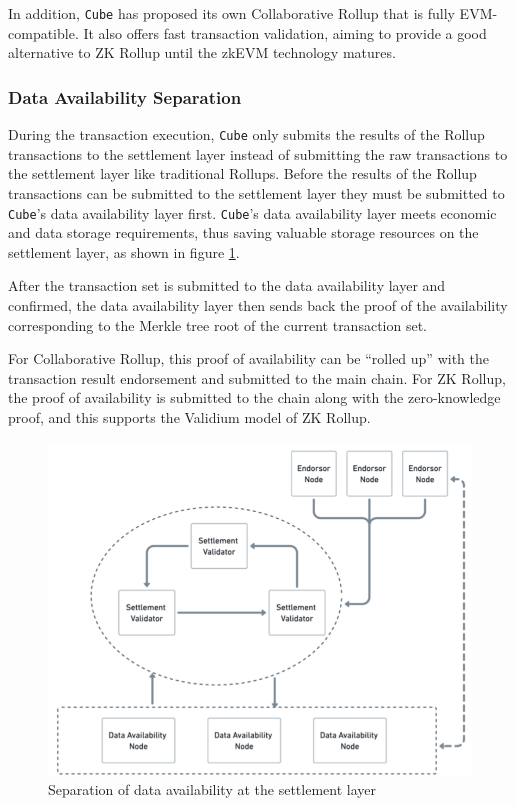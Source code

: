\documentclass{iacrtrans}
\begin{document}
In addition, \texttt{Cube} has proposed its own Collaborative Rollup that is fully EVM-compatible. It also offers fast transaction validation, aiming to provide a good alternative to ZK Rollup until the zkEVM technology matures.


\subsubsection{Data Availability Separation}
During the transaction execution, \texttt{Cube} only submits the results of the Rollup transactions to the settlement layer instead of submitting the raw transactions to the settlement layer like traditional Rollups. Before the results of the Rollup transactions can be submitted to the settlement layer they must be submitted to \texttt{Cube}'s data availability layer first. \texttt{Cube}'s data availability layer meets economic and data storage requirements, thus saving valuable storage resources on the settlement layer, as shown in figure \ref{fig:2}. 

After the transaction set is submitted to the data availability layer and confirmed, the data availability layer then sends back the proof of the availability corresponding to the Merkle tree root of the current transaction set.

For Collaborative Rollup, this proof of availability can be “rolled up” with the transaction result endorsement and submitted to the main chain. For ZK Rollup, the proof of availability is submitted to the chain along with the zero-knowledge proof, and this supports the Validium model of ZK Rollup.

\begin{figure}[h]
	\centering
	\includegraphics[width=0.8 \textwidth]{images/2.png}
	\caption{Separation of data availability at the settlement layer}
	\label{fig:2} 
\end{figure}
\end{document}
